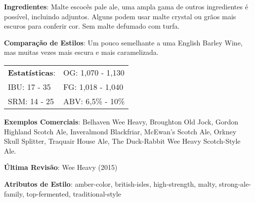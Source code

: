 \textbf{Ingredientes}: Malte escocês pale ale, uma ampla gama de outros ingredientes é possível, incluindo adjuntos. Alguns podem usar malte crystal ou grãos mais escuros para conferir cor. Sem malte defumado com turfa.

\textbf{Comparação de Estilos}: Um pouco semelhante a uma English Barley Wine, mas muitas vezes mais escura e mais caramelizada.

\begin{tabular}{@{}p{35mm}p{35mm}@{}}
  \textbf{Estatísticas}: & OG: 1,070 - 1,130 \\
  IBU: 17 - 35  & FG: 1,018 - 1,040  \\
  SRM: 14 - 25  & ABV: 6,5\% - 10\%
\end{tabular}

\textbf{Exemplos Comerciais}: Belhaven Wee Heavy, Broughton Old Jock, Gordon Highland Scotch Ale, Inveralmond Blackfriar, McEwan's Scotch Ale, Orkney Skull Splitter, Traquair House Ale, The Duck-Rabbit Wee Heavy Scotch-Style Ale.

\textbf{Última Revisão}: Wee Heavy (2015)

\textbf{Atributos de Estilo}: amber-color, british-isles, high-strength, malty, strong-ale-family, top-fermented, traditional-style
